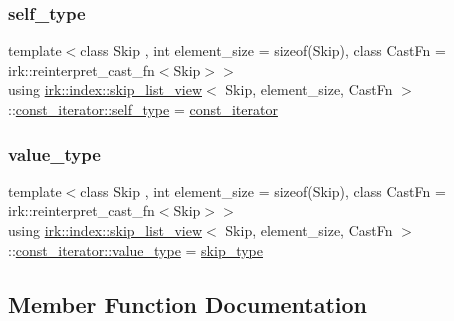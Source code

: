 \subsubsection{\texorpdfstring{self\+\_\+type}{self\_type}}
{\footnotesize\ttfamily template$<$class Skip , int element\+\_\+size = sizeof(\+Skip), class Cast\+Fn  = irk\+::reinterpret\+\_\+cast\+\_\+fn$<$\+Skip$>$$>$ \\
using \mbox{\hyperlink{classirk_1_1index_1_1skip__list__view}{irk\+::index\+::skip\+\_\+list\+\_\+view}}$<$ Skip, element\+\_\+size, Cast\+Fn $>$\+::\mbox{\hyperlink{structirk_1_1index_1_1skip__list__view_1_1const__iterator_a1b3eae3418d5b4d4f055a6841bd46ffa}{const\+\_\+iterator\+::self\+\_\+type}} =  \mbox{\hyperlink{structirk_1_1index_1_1skip__list__view_1_1const__iterator}{const\+\_\+iterator}}}

\mbox{\label{structirk_1_1index_1_1skip__list__view_1_1const__iterator_a7239886fa2b4671502a6712298b25324}} 
\subsubsection{\texorpdfstring{value\+\_\+type}{value\_type}}
{\footnotesize\ttfamily template$<$class Skip , int element\+\_\+size = sizeof(\+Skip), class Cast\+Fn  = irk\+::reinterpret\+\_\+cast\+\_\+fn$<$\+Skip$>$$>$ \\
using \mbox{\hyperlink{classirk_1_1index_1_1skip__list__view}{irk\+::index\+::skip\+\_\+list\+\_\+view}}$<$ Skip, element\+\_\+size, Cast\+Fn $>$\+::\mbox{\hyperlink{structirk_1_1index_1_1skip__list__view_1_1const__iterator_a7239886fa2b4671502a6712298b25324}{const\+\_\+iterator\+::value\+\_\+type}} =  \mbox{\hyperlink{classirk_1_1index_1_1skip__list__view_a7fa2224428803eee24062bb123978755}{skip\+\_\+type}}}



\subsection{Member Function Documentation}
\mbox{\label{structirk_1_1index_1_1skip__list__view_1_1const__iterator_a986e8294e13ef860e85a3b35640806a2}} 
